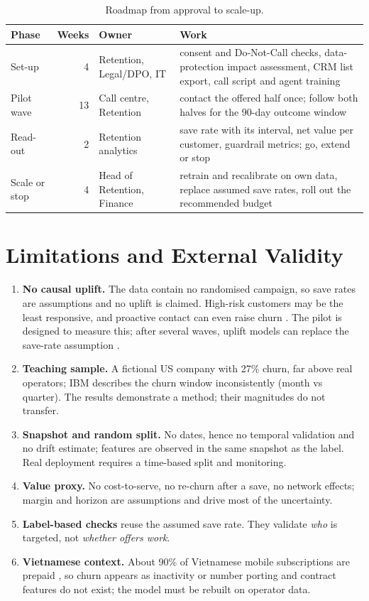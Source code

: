 \documentclass[11pt,a4paper]{article}
\begin{document}
\begin{table}[H]
\centering\small
\caption{Roadmap from approval to scale-up.}\label{tab:roadmap}
\begin{tabularx}{\linewidth}{@{}lrp{3.6cm}X@{}}
\toprule
\textbf{Phase} & \textbf{Weeks} & \textbf{Owner} & \textbf{Work} \\
\midrule
Set-up & 4 & Retention, Legal/DPO, IT & consent and Do-Not-Call checks, data-protection impact assessment, CRM list export, call script and agent training \\
Pilot wave & 13 & Call centre, Retention & contact the offered half once; follow both halves for the 90-day outcome window \\
Read-out & 2 & Retention analytics & save rate with its interval, net value per customer, guardrail metrics; go, extend or stop \\
Scale or stop & 4 & Head of Retention, Finance & retrain and recalibrate on own data, replace assumed save rates, roll out the recommended budget \\
\bottomrule
\end{tabularx}
\end{table}

\section{Limitations and External Validity}

\begin{enumerate}
  \item \textbf{No causal uplift.} The data contain no randomised campaign, so save rates are assumptions and no uplift is claimed. High-risk customers may be the least responsive, and proactive contact can even raise churn \cite{ascarza2016,ascarza2018}. The pilot is designed to measure this; after several waves, uplift models can replace the save-rate assumption \cite{devriendt2021}.
  \item \textbf{Teaching sample.} A fictional US company with 27\% churn, far above real operators; IBM describes the churn window inconsistently (month vs quarter). The results demonstrate a method; their magnitudes do not transfer.
  \item \textbf{Snapshot and random split.} No dates, hence no temporal validation and no drift estimate; features are observed in the same snapshot as the label. Real deployment requires a time-based split and monitoring.
  \item \textbf{Value proxy.} No cost-to-serve, no re-churn after a save, no network effects; margin and horizon are assumptions and drive most of the uncertainty.
  \item \textbf{Label-based checks} reuse the assumed save rate. They validate \emph{who} is targeted, not \emph{whether offers work}.
  \item \textbf{Vietnamese context.} About 90\% of Vietnamese mobile subscriptions are prepaid \cite{sggp2022}, so churn appears as inactivity or number porting and contract features do not exist; the model must be rebuilt on operator data.
\end{enumerate}
\end{document}
